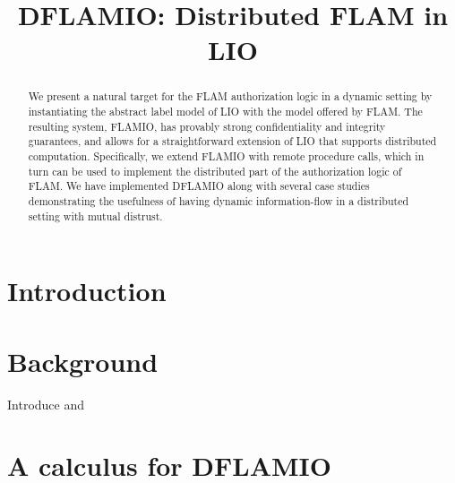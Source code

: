 \documentclass[conference]{IEEEtran}
\begin{document}
\title{DFLAMIO: Distributed FLAM in LIO}

\author{
}

\maketitle

\begin{abstract}
We present a natural target for the FLAM authorization logic in a dynamic setting by instantiating the abstract label model of LIO with the model offered by FLAM. The resulting system, FLAMIO, has provably strong confidentiality and integrity guarantees, and allows for a straightforward extension of LIO that supports distributed computation. Specifically, we extend FLAMIO with remote procedure calls, which in turn can be used to implement the distributed part of the authorization logic of FLAM. We have implemented DFLAMIO along with several case studies demonstrating the usefulness of having dynamic information-flow in a distributed setting with mutual distrust.
\end{abstract}


\section{Introduction}

\section{Background}

Introduce \cite{Arden:2015:FA:2859845.2859998} and \cite{SRMMlio}

\section{A calculus for DFLAMIO}\label{lab:calculus}
\end{document}
